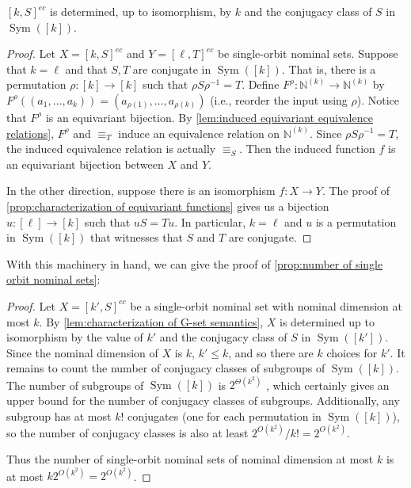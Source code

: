 \documentclass[runningheads]{llncs}
\newcommand{\bb}{\mathbb}
\DeclareMathOperator{\Sym}{Sym}
\begin{document}
\begin{lemma} \label{lem:characterization of G-set semantics}
    $[k,S]^{ec}$ is determined, up to isomorphism, by $k$ and the conjugacy class of $S$ in $\Sym([k])$. 
\end{lemma}

\begin{proof}
    Let $X = [k,S]^{ec}$ and $Y = [\ell,T]^{ec}$ be single-orbit nominal sets.
    Suppose that $k = \ell$ and that $S,T$ are conjugate in $\Sym([k])$. 
    That is, there is a permutation $\rho : [k] \to [k]$ such that $\rho S \rho^{-1} = T$. 
    Define $F^\rho : \bb N^{(k)} \to \bb N^{(k)}$ by $F^\rho((a_1, \ldots, a_k)) = (a_{\rho(1)}, \ldots, a_{\rho(k)})$ (i.e., reorder the input using $\rho$). 
    Notice that $F^\rho$ is an equivariant bijection.
    By \autoref{lem:induced equivariant equivalence relations}, $F^\rho$ and $\equiv_T$ induce an equivalence relation on $\bb N^{(k)}$.
    Since $\rho S \rho^{-1} = T$, the induced equivalence relation is actually $\equiv_S$. 
    Then the induced function $f$ is an equivariant bijection between $X$ and $Y$.
    
    In the other direction, suppose there is an isomorphism $f : X \to Y$.
    The proof of \autoref{prop:characterization of equivariant functions} gives us a bijection $u : [\ell] \to [k]$ such that $uS = Tu$. 
    In particular, $k=\ell$ and $u$ is a permutation in $\Sym([k])$ that witnesses that $S$ and $T$ are conjugate. 
\end{proof}

With this machinery in hand, we can give the proof of \autoref{prop:number of single orbit nominal sets}:

\begin{proof}
    Let $X = [k',S]^{ec}$ be a single-orbit nominal set with nominal dimension at most $k$. 
    By \autoref{lem:characterization of G-set semantics}, $X$ is determined up to isomorphism by the value of $k'$ and the conjugacy class of $S$ in $\Sym([k'])$. 
    Since the nominal dimension of $X$ is $k$, $k' \leq k$, and so there are $k$ choices for $k'$. It remains to count the number of conjugacy classes of subgroups of $\Sym([k])$. 
    The number of subgroups of $\Sym([k])$ is $2^{\Theta(k^2)}$ \cite[Theorem 4.2]{pyber:asymptotic-results-permutation-groups}, which certainly gives an upper bound for the number of conjugacy classes of subgroups. 
    Additionally, any subgroup has at most $k!$ conjugates (one for each permutation in $\Sym([k])$), so the number of conjugacy classes is also at least $2^{O(k^2)}/k! = 2^{O(k^2)}$.
    
    Thus the number of single-orbit nominal sets of nominal dimension at most $k$ is at most $k 2^{O(k^2)} = 2^{O(k^2)}$. 
\end{proof}
\end{document}
